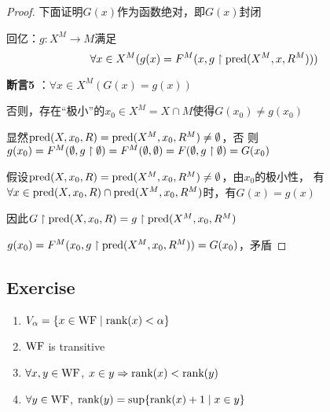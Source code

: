\documentclass[11pt]{article}
\begin{document}
\begin{proof}
下面证明\(G(x)\)作为函数绝对，即\(G(x)\)封闭

回亿：\(g:X^M\to M\)满足
\begin{equation*}
\forall x\in X^M(g(x)=F^M(x,g\upharpoonright\text{pred}(X^M,x,R^M)))
\end{equation*}

\textbf{断言5} ：\(\forall x\in X^M(G(x)=g(x))\)

否则，存在“极小”的\(x_0\in X^M=X\cap M\)使得\(G(x_0)\neq g(x_0)\)

显然\(\text{pred}(X,x_0,R)=\text{pred}(X^M,x_0,R^M)\neq\emptyset\)，否
则\(g(x_0)=F^M(\emptyset,g\upharpoonright\emptyset)=F^M(\emptyset,\emptyset)=F(\emptyset,g\upharpoonright\emptyset)=G(x_0)\)

假设\(\text{pred}(X,x_0,R)=\text{pred}(X^M,x_0,R^M)\neq\emptyset\)，由\(x_0\)的极小性，
有\(\forall x\in\text{pred}(X,x_0,R)\cap\text{pred}(X^M,x_0,R^M)\)时，有\(G(x)=g(x)\)

因此\(G\upharpoonright\text{pred}(X,x_0,R)=g\upharpoonright\text{pred}(X^M,x_0,R^M)\)

\(g(x_0)=F^M(x_0,g\upharpoonright\text{pred}(X^M,x_0,R^M))=G(x_0)\)，矛盾
\end{proof}




\subsection{Exercise}
\label{sec:org1a2055b}
\begin{exercise}
\label{ex7.10.3}
\begin{enumerate}
\item \(V_\alpha=\{x\in\operatorname{WF}\mid\text{rank}(x)<\alpha\}\)
\item \(\operatorname{WF}\) is transitive
\item \(\forall x,y\in\operatorname{WF}\), \(x\in y\Rightarrow\text{rank}(x)<\text{rank}(y)\)
\item \(\forall y\in\operatorname{WF}\), \(\text{rank}(y)=\sup\{\text{rank}(x)+1\mid x\in y\}\)
\end{enumerate}
\end{exercise}
\end{document}
